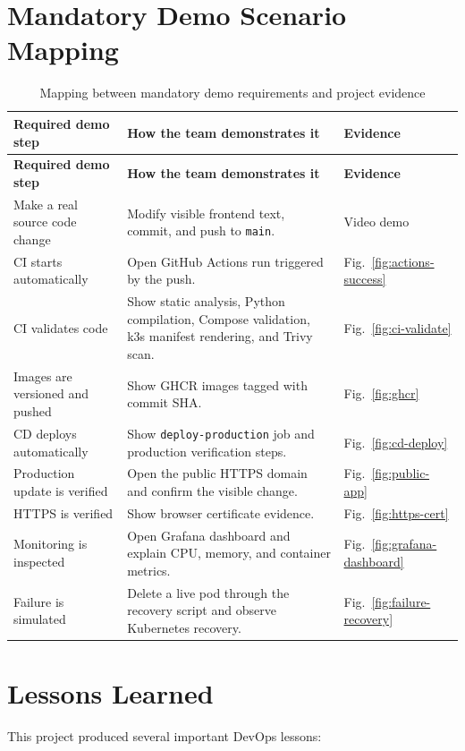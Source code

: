 \documentclass[12pt,a4paper]{report}
\begin{document}
\section{Mandatory Demo Scenario Mapping}
\begin{longtable}{p{} p{} p{}}
\caption{Mapping between mandatory demo requirements and project evidence}\\
\toprule
\textbf{Required demo step} & \textbf{How the team demonstrates it} & \textbf{Evidence} \\
\midrule
\endfirsthead
\toprule
\textbf{Required demo step} & \textbf{How the team demonstrates it} & \textbf{Evidence} \\
\midrule
\endhead
Make a real source code change & Modify visible frontend text, commit, and push to \texttt{main}. & Video demo \\
CI starts automatically & Open GitHub Actions run triggered by the push. & Fig.~\ref{fig:actions-success} \\
CI validates code & Show static analysis, Python compilation, Compose validation, k3s manifest rendering, and Trivy scan. & Fig.~\ref{fig:ci-validate} \\
Images are versioned and pushed & Show GHCR images tagged with commit SHA. & Fig.~\ref{fig:ghcr} \\
CD deploys automatically & Show \texttt{deploy-production} job and production verification steps. & Fig.~\ref{fig:cd-deploy} \\
Production update is verified & Open the public HTTPS domain and confirm the visible change. & Fig.~\ref{fig:public-app} \\
HTTPS is verified & Show browser certificate evidence. & Fig.~\ref{fig:https-cert} \\
Monitoring is inspected & Open Grafana dashboard and explain CPU, memory, and container metrics. & Fig.~\ref{fig:grafana-dashboard} \\
Failure is simulated & Delete a live pod through the recovery script and observe Kubernetes recovery. & Fig.~\ref{fig:failure-recovery} \\
\bottomrule
\end{longtable}

\section{Lessons Learned}
This project produced several important DevOps lessons:
\end{document}
